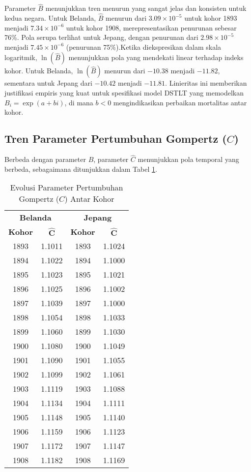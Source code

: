 Parameter $\hat{B}$ menunjukkan tren menurun yang sangat jelas dan konsisten untuk kedua negara. Untuk Belanda, $\hat{B}$ menurun dari $3.09 \times 10^{-5}$ untuk kohor 1893 menjadi $7.34 \times 10^{-6}$ untuk kohor 1908, merepresentasikan penurunan sebesar 76\%. Pola serupa terlihat untuk Jepang, dengan penurunan dari $2.98 \times 10^{-5}$ menjadi $7.45 \times 10^{-6}$ (penurunan 75\%).Ketika diekspresikan dalam skala logaritmik, $\ln(\hat{B})$ menunjukkan pola yang mendekati linear terhadap indeks kohor. Untuk Belanda, $\ln(\hat{B})$ menurun dari $-10.38$ menjadi $-11.82$, sementara untuk Jepang dari $-10.42$ menjadi $-11.81$. Linieritas ini memberikan justifikasi empiris yang kuat untuk spesifikasi model DSTLT yang memodelkan $B_i = \exp(a + bi)$, di mana $b < 0$ mengindikasikan perbaikan mortalitas antar kohor.

\subsection{Tren Parameter Pertumbuhan Gompertz ($C$)}

Berbeda dengan parameter $B$, parameter $\hat{C}$ menunjukkan pola temporal yang berbeda, sebagaimana ditunjukkan dalam Tabel \ref{tab:parameter_C_trends}.

\begin{table}[htbp]
\centering
\caption{Evolusi Parameter Pertumbuhan Gompertz ($C$) Antar Kohor}
\label{tab:parameter_C_trends}
\small
\begin{tabular}{cc|cc}
\hline
\multicolumn{2}{c|}{\textbf{Belanda}} & \multicolumn{2}{c}{\textbf{Jepang}} \\
\textbf{Kohor} & $\boldsymbol{\hat{C}}$ & \textbf{Kohor} & $\boldsymbol{\hat{C}}$ \\
\hline
1893 & 1.1011 & 1893 & 1.1024 \\
1894 & 1.1022 & 1894 & 1.1000 \\
1895 & 1.1023 & 1895 & 1.1021 \\
1896 & 1.1025 & 1896 & 1.1002 \\
1897 & 1.1039 & 1897 & 1.1000 \\
1898 & 1.1054 & 1898 & 1.1033 \\
1899 & 1.1060 & 1899 & 1.1030 \\
1900 & 1.1080 & 1900 & 1.1049 \\
1901 & 1.1090 & 1901 & 1.1055 \\
1902 & 1.1099 & 1902 & 1.1061 \\
1903 & 1.1119 & 1903 & 1.1088 \\
1904 & 1.1134 & 1904 & 1.1111 \\
1905 & 1.1148 & 1905 & 1.1140 \\
1906 & 1.1159 & 1906 & 1.1123 \\
1907 & 1.1172 & 1907 & 1.1147 \\
1908 & 1.1182 & 1908 & 1.1169 \\
\hline
\end{tabular}
\end{table}


